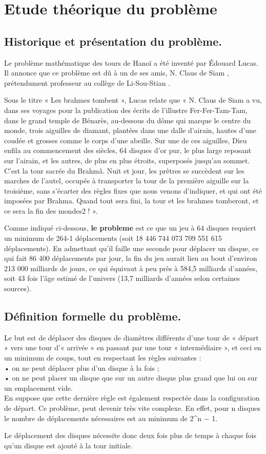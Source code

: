 \chapter{Etude théorique du problème}
\section{Historique et présentation du problème.}
Le problème mathématique des tours de Hanoï a été inventé par Édouard Lucas. Il annonce que ce problème est dû à un de ses amis, N. Claus de Siam , prétendument professeur au collège de Li-Sou-Stian .

Sous le titre « Les brahmes tombent », Lucas relate que « N. Claus de Siam a vu, dans ses voyages pour la publication des écrits de l'illustre Fer-Fer-Tam-Tam, dans le grand temple de Bénarès, au-dessous du dôme qui marque le centre du monde, trois aiguilles de diamant, plantées dans une dalle d'airain, hautes d'une coudée et grosses comme le corps d'une abeille. Sur une de ces aiguilles, Dieu enfila au commencement des siècles, 64 disques d'or pur, le plus large reposant sur l'airain, et les autres, de plus en plus étroits, superposés jusqu'au sommet. C'est la tour sacrée du Brahmâ. Nuit et jour, les prêtres se succèdent sur les marches de l'autel, occupés à transporter la tour de la première aiguille sur la troisième, sans s'écarter des règles fixes que nous venons d'indiquer, et qui ont été imposées par Brahma. Quand tout sera fini, la tour et les brahmes tomberont, et ce sera la fin des mondes2 ! ».

Comme indiqué ci-dessous, \textbf{le probleme} est ce que un jeu à 64 disques requiert un minimum de 264-1 déplacements (soit 18 446 744 073 709 551 615 déplacements). En admettant qu'il faille une seconde pour déplacer un disque, ce qui fait 86 400 déplacements par jour, la fin du jeu aurait lieu au bout d'environ 213 000 milliards de jours, ce qui équivaut à peu près à 584,5 milliards d'années, soit 43 fois l'âge estimé de l'univers (13,7 milliards d'années selon certaines sources).


\section{Définition formelle du problème.}
Le but est de déplacer des disques de diamètres différents d'une tour de
« départ » vers une tour d'« arrivée » en passant par une tour « intermédiaire », et ceci
en un minimum de coups, tout en respectant les règles suivantes :\\
• on ne peut déplacer plus d'un disque à la fois ;\\
• on ne peut placer un disque que sur un autre disque plus grand que lui ou sur
un emplacement vide.\\
En suppose que cette dernière règle est également respectée dans la configuration
de départ.
Ce problème, peut devenir très vite complexe. En effet, pour n disques le nombre de
déplacements nécessaires est au minimum de 2^n − 1. 
\par
Le déplacement des disques nécessite donc deux fois plus de temps à chaque fois qu’un disque est ajouté à la tour initiale.

